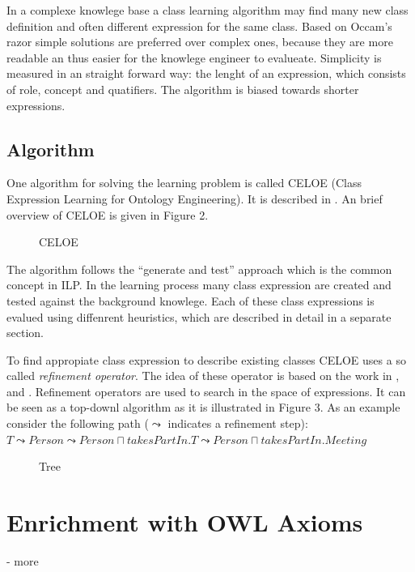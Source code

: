 In a complexe knowlege base a class learning algorithm may find many new class
definition and often different expression for the same class. Based on Occam's
razor \cite{occam-razor} simple solutions are preferred over complex ones,
because they are more readable an thus easier for the knowlege engineer to
evalueate. Simplicity is measured in an straight forward way: the lenght of an
expression, which consists of role, concept and quatifiers.
The algorithm is biased towards shorter expressions. \cite{paper1}

\subsection*{Algorithm}
One algorithm for solving the learning problem is called CELOE (Class
Expression Learning for Ontology Engineering). It is described in \cite{paper1}.
An brief overview of CELOE is given in Figure 2.
\begin{figure}
\label{celoe}
\centering
{}
\caption{CELOE\cite{paper1}}
\end{figure}
The algorithm follows the ``generate and test'' approach which is the common
concept in ILP. 
In the learning process many class expression are created and tested against the
background knowlege. Each of these class expressions is evalued using diffenrent
heuristics, which are described in detail in a separate section.

To find appropiate class expression to describe existing classes CELOE uses a so
called \emph{refinement operator}. The idea of these operator is based on the
work in \cite{refinement1},\cite{refinement2} and \cite{refinement3}. Refinement
operators are used to search in the space of expressions. It can be seen as a
top-downl algorithm as it is illustrated in Figure 3.
As an example consider the following path ($\leadsto$ indicates a refinement
step):\vspace{6pt}\\
$T \leadsto Person \leadsto Person \sqcap takesPartIn.T \leadsto Person \sqcap
takesPartIn.Meeting$

\begin{figure}
\label{tree}
\centering
{}
\caption{Tree\cite{paper1}}
\end{figure}

\section{Enrichment with OWL Axioms}
- more

